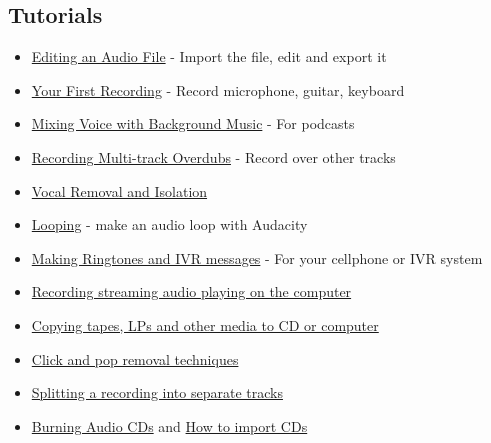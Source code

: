 \begin{multicols}{2}
\subsection{Tutorials}
\label{index:tutorials}
\label{index:skiptheimage}
\begin{itemize}
\item 
\hyperref[\foo{man:tutorial:editing:an:existing:file:}]{Editing an Audio File}
 - Import the file, edit and export it
\item 
\hyperref[\foo{man:tutorial:your:first:recording:}]{Your First Recording}
 - Record microphone, guitar, keyboard
\item 
\hyperref[\foo{man:tutorial:mixing:a:narration:with:background:music:}]{Mixing Voice with Background Music}
 - For podcasts
\item 
\hyperref[\foo{man:tutorial:recording:multi:track:overdubs:}]{Recording Multi-track Overdubs}
 - Record over other tracks
\item 
\hyperref[\foo{man:tutorial:vocal:removal:and:isolation:}]{Vocal Removal and Isolation}

\item 
\hyperref[\foo{man:tutorial:looping:}]{Looping}
 - make an audio loop with Audacity
\item 
\hyperref[\foo{man:tutorial:making:ringtones:and:ivr:messages:}]{Making Ringtones and IVR messages}
 - For your cellphone or IVR system
\item 
\hyperref[\foo{man:tutorial:recording:audio:playing:on:the:computer:}]{Recording streaming audio playing on the computer}

\end{itemize}

\begin{itemize}
\item 
\hyperref[\foo{man:tutorial:copying:tapes:lps:or:minidiscs:to:cd:}]{Copying tapes, LPs and other media to CD or computer}

\item 
\hyperref[\foo{man:tutorial:click:and:pop:removal:techniques:}]{Click and pop removal techniques}

\item 
\hyperref[\foo{man:splitting:a:recording:into:separate:tracks:}]{Splitting a recording into separate tracks}

\item 
\hyperref[\foo{man:burning:music:files:to:a:cd:}]{Burning Audio CDs}
 and 
\hyperref[\foo{man:tutorial:how:to:import:cds:}]{How to import CDs}


\end{itemize}
\end{multicols}
